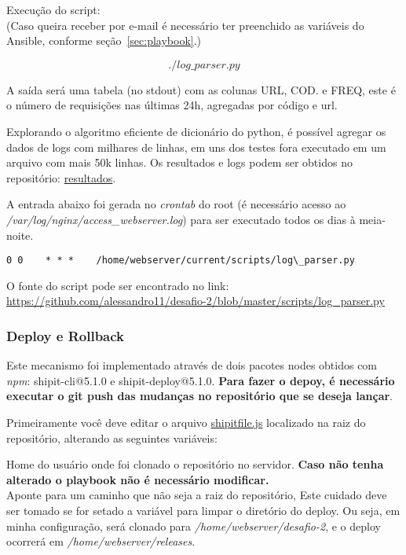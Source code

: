 Execução do script:\\
(Caso queira receber por e-mail é necessário ter preenchido as
variáveis do Ansible, conforme seção~\ref{sec:playbook}.)

$$./log\_parser.py$$

A saída será uma tabela (no stdout) com as colunas URL, COD. e FREQ, este é o
número de requisições nas últimas 24h, agregadas por código e url.

Explorando o algoritmo eficiente de dicionário do python, é possível
agregar os dados de logs com milhares de linhas, em uns dos testes
fora executado em um arquivo com mais 50k linhas. Os resultados e logs
podem ser obtidos no repositório:
\href{https://github.com/alessandro11/linx-challenge/tree/master/results}{resultados}.

A entrada abaixo foi gerada no \emph{crontab} do root (é necessário
acesso ao \textit{/var/log/nginx/access\_webserver.log}) para ser
executado todos os dias à meia-noite.

\begin{verbatim}
0 0    * * *    /home/webserver/current/scripts/log\_parser.py
\end{verbatim}

O fonte do script pode ser encontrado no link:\\
\href{https://github.com/alessandro11/desafio-2/blob/master/scripts/log\_parser.py}{https://github.com/alessandro11/desafio-2/blob/master/scripts/log\_parser.py} \label{lnk:logparser}


\subsubsection{Deploy e Rollback}
Este mecanismo foi implementado através de dois pacotes nodes obtidos com
\emph{npm}: shipit-cli@5.1.0 e shipit-deploy@5.1.0. \textbf{Para fazer o depoy,
é necessário executar o git push das mudanças no repositório que se deseja lançar}.

Primeiramente você deve editar o arquivo
\href{https://github.com/alessandro11/desafio-2/blob/master/shipitfile.js}{shipitfile.js}
localizado na raiz do repositório, alterando as seguintes variáveis:

Home do usuário onde foi clonado o repositório no servidor. \textbf{Caso não
tenha alterado o playbook não é necessário modificar.}\\

\color{red}
Aponte para um caminho que não seja a raiz do repositório,
Este cuidado deve ser tomado se for setado a variável para limpar o
diretório do deploy. Ou seja, em minha configuração, será clonado
para \textit{/home/webserver/desafio-2}, e o deploy ocorrerá em
\textit{/home/webserver/releases}.


